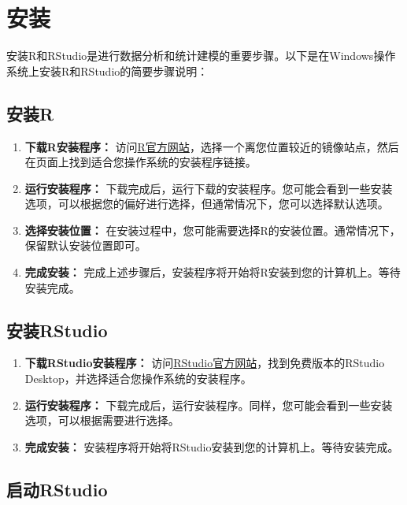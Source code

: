 \documentclass[
  letterpaper,
  DIV=11,
  numbers=noendperiod]{scrreprt}
\begin{document}
\hypertarget{ux5b89ux88c5}{%
\chapter{安装}\label{ux5b89ux88c5}}

安装R和RStudio是进行数据分析和统计建模的重要步骤。以下是在Windows操作系统上安装R和RStudio的简要步骤说明：

\hypertarget{ux5b89ux88c5r}{%
\section{安装R}\label{ux5b89ux88c5r}}

\begin{enumerate}
\def\labelenumi{\arabic{enumi}.}
\item
  \textbf{下载R安装程序：}
  访问\href{https://cran.r-project.org/mirrors.html}{R官方网站}，选择一个离您位置较近的镜像站点，然后在页面上找到适合您操作系统的安装程序链接。
\item
  \textbf{运行安装程序：}
  下载完成后，运行下载的安装程序。您可能会看到一些安装选项，可以根据您的偏好进行选择，但通常情况下，您可以选择默认选项。
\item
  \textbf{选择安装位置：}
  在安装过程中，您可能需要选择R的安装位置。通常情况下，保留默认安装位置即可。
\item
  \textbf{完成安装：}
  完成上述步骤后，安装程序将开始将R安装到您的计算机上。等待安装完成。
\end{enumerate}

\hypertarget{ux5b89ux88c5rstudio}{%
\section{安装RStudio}\label{ux5b89ux88c5rstudio}}

\begin{enumerate}
\def\labelenumi{\arabic{enumi}.}
\item
  \textbf{下载RStudio安装程序：}
  访问\href{https://www.rstudio.com/products/rstudio/download/}{RStudio官方网站}，找到免费版本的RStudio
  Desktop，并选择适合您操作系统的安装程序。
\item
  \textbf{运行安装程序：}
  下载完成后，运行安装程序。同样，您可能会看到一些安装选项，可以根据需要进行选择。
\item
  \textbf{完成安装：}
  安装程序将开始将RStudio安装到您的计算机上。等待安装完成。
\end{enumerate}

\hypertarget{ux542fux52a8rstudio}{%
\section{启动RStudio}\label{ux542fux52a8rstudio}}
\end{document}
